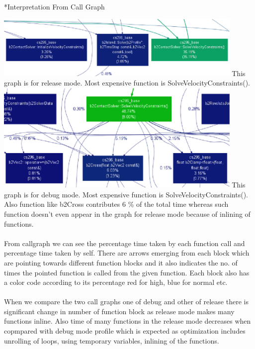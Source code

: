 \documentclass[11pt]{article}
\begin{document}
\begin{section}
\begin{subsection}*{Interpretation From Call Graph}

\includegraphics[width=0.9\textwidth,keepaspectratio]{release1.eps} 
\newline \newline
This graph is for release mode. Most expensive function is SolveVelocityConstraints().
\newline \newline
 \includegraphics[width=0.9\textwidth,keepaspectratio]{debug1.eps}
 \newline \newline
This graph is for debug mode. Most expensive function is SolveVelocityConstraints(). Also function like b2Cross contributes 6 \%  of the total time whereas such function doesn't even appear in the graph for release mode because of inlining of functions. ~\cite{Perf}
\\\\  
 From callgraph we can see the percentage time taken by each function call and percentage time taken by self. There are arrows emerging from each block which are pointing towards different function blocks and it also indicates the no. of times the pointed function is called from the given function. Each block also has a color code according to its percentage red for high, blue for normal etc. 
\\\\
When we compare the two call graphs one of debug and other of release there is significant change in number of function block as release mode makes many functions inline. Also time of many functions in the release mode decreases when copmpared with debug mode profile which is expected as optimization includes unrolling of loops, using temporary variables, inlining of the functions.
\end{subsection}

 

\end{section}



\end{document}
